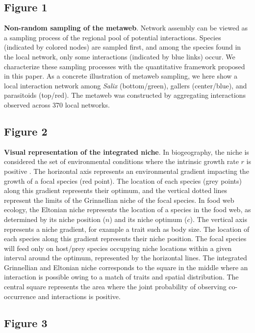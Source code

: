 \documentclass[12pt]{article}
\begin{document}
\subsection*{Figure 1}

\textbf{Non-random sampling of the metaweb}. Network assembly can be viewed
as a sampling process of the regional pool of potential interactions. Species
(indicated by colored nodes) are sampled first, and among the species found in
the local network, only some interactions (indicated by blue links) occur.
We characterize these sampling processes with the quantitative framework
proposed in this paper. As a concrete illustration of metaweb sampling, we
here show a local interaction network among \textit{Salix} (bottom/green), gallers
(center/blue), and parasitoids (top/red). The metaweb was constructed by
aggregating interactions observed across 370 local networks.

\subsection*{Figure 2}

\textbf{Visual representation of the integrated niche}. In biogeography, the
niche is considered the set of environmental conditions where the intrinsic
growth rate $r$ is positive \citep{Holt2009a}. The horizontal axis represents
an environmental gradient impacting the growth of a focal species (red point).
The location of each species (grey points) along this gradient represents their
optimum, and the vertical dotted lines represent the limits of the Grinnellian
niche of the focal species. In food web ecology, the Eltonian niche represents
the location of a species in the food web, as determined by its niche position
($n$) and its niche optimum ($c$). The vertical axis represents a niche
gradient, for example a trait such as body size. The location of each species
along this gradient represents their niche position. The focal species will
feed only on host/prey species occupying niche locations within a given interval
around the optimum, represented by the horizontal lines. The integrated
Grinnellian and Eltonian niche corresponds to the square in the middle where
an interaction is possible owing to a match of traits and spatial
distribution. The central square represents the area where the joint
probability of observing co-occurrence and interactions is positive.

\subsection*{Figure 3}
\end{document}
